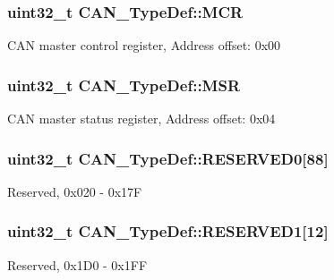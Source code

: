 \subsubsection[{\texorpdfstring{M\+CR}{MCR}}]{ uint32\+\_\+t C\+A\+N\+\_\+\+Type\+Def\+::\+M\+CR}\hypertarget{struct_c_a_n___type_def_a1282eee79a22003257a7a5daa7f4a35f}{}\label{struct_c_a_n___type_def_a1282eee79a22003257a7a5daa7f4a35f}
C\+AN master control register, Address offset\+: 0x00 
\subsubsection[{\texorpdfstring{M\+SR}{MSR}}]{ uint32\+\_\+t C\+A\+N\+\_\+\+Type\+Def\+::\+M\+SR}\hypertarget{struct_c_a_n___type_def_af98b957a4e887751fbd407d3e2cf93b5}{}\label{struct_c_a_n___type_def_af98b957a4e887751fbd407d3e2cf93b5}
C\+AN master status register, Address offset\+: 0x04 
\subsubsection[{\texorpdfstring{R\+E\+S\+E\+R\+V\+E\+D0}{RESERVED0}}]{\setlength{\rightskip}{0pt plus 5cm}uint32\+\_\+t C\+A\+N\+\_\+\+Type\+Def\+::\+R\+E\+S\+E\+R\+V\+E\+D0\mbox{[}88\mbox{]}}\hypertarget{struct_c_a_n___type_def_ad0cc7fb26376c435bbf148e962739337}{}\label{struct_c_a_n___type_def_ad0cc7fb26376c435bbf148e962739337}
Reserved, 0x020 -\/ 0x17F 
\subsubsection[{\texorpdfstring{R\+E\+S\+E\+R\+V\+E\+D1}{RESERVED1}}]{\setlength{\rightskip}{0pt plus 5cm}uint32\+\_\+t C\+A\+N\+\_\+\+Type\+Def\+::\+R\+E\+S\+E\+R\+V\+E\+D1\mbox{[}12\mbox{]}}\hypertarget{struct_c_a_n___type_def_a046ef464378aaaaafaf999c23a4dc55e}{}\label{struct_c_a_n___type_def_a046ef464378aaaaafaf999c23a4dc55e}
Reserved, 0x1\+D0 -\/ 0x1\+FF 
